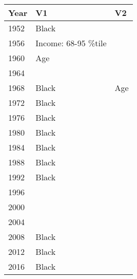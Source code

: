 \begin{tabular}{lll}
  \toprule
Year & V1 & V2 \\ 
  \midrule
1952 & Black &  \\ 
  1956 & Income: 68-95 \%tile &  \\ 
  1960 & Age &  \\ 
  1964 &  &  \\ 
  1968 & Black & Age \\ 
  1972 & Black &  \\ 
  1976 & Black &  \\ 
  1980 & Black &  \\ 
  1984 & Black &  \\ 
  1988 & Black &  \\ 
  1992 & Black &  \\ 
  1996 &  &  \\ 
  2000 &  &  \\ 
  2004 &  &  \\ 
  2008 & Black &  \\ 
  2012 & Black &  \\ 
  2016 & Black &  \\ 
   \bottomrule
\end{tabular}
